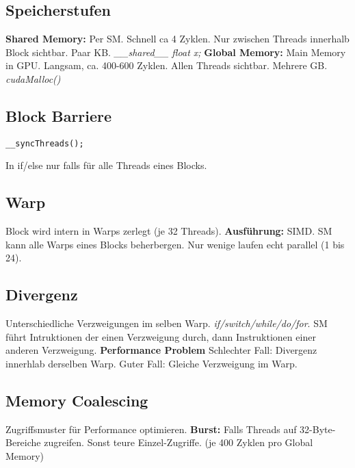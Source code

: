 \subsection{Speicherstufen}
\textbf{Shared Memory:} Per SM.
Schnell ca 4 Zyklen.
Nur zwischen Threads innerhalb Block sichtbar.
Paar KB.
\textit{\_\_shared\_\_ float x;}
\textbf{Global Memory:}
Main Memory in GPU.
Langsam, ca. 400-600 Zyklen.
Allen Threads sichtbar.
Mehrere GB.
\textit{cudaMalloc()}

\subsection{Block Barriere}
\begin{lstlisting}
__syncThreads();
\end{lstlisting}
In if/else nur falls für alle Threads eines Blocks.

\subsection{Warp}
Block wird intern in Warps zerlegt (je 32 Threads).
\textbf{Ausführung:} SIMD.
SM kann alle Warps eines Blocks beherbergen. Nur wenige laufen echt parallel (1 bis 24).

\subsection{Divergenz}
Unterschiedliche Verzweigungen im selben Warp.
\textit{if/switch/while/do/for}.
SM führt Intruktionen der einen Verzweigung durch, dann Instruktionen einer anderen Verzweigung.
\textbf{Performance Problem}
Schlechter Fall: Divergenz innerhlab derselben Warp.
Guter Fall: Gleiche Verzweigung im Warp.

\subsection{Memory Coalescing}
Zugriffsmuster für Performance optimieren.
\textbf{Burst:}  Falls Threads auf 32-Byte-Bereiche zugreifen.
Sonst teure Einzel-Zugriffe. (je 400 Zyklen pro Global Memory)